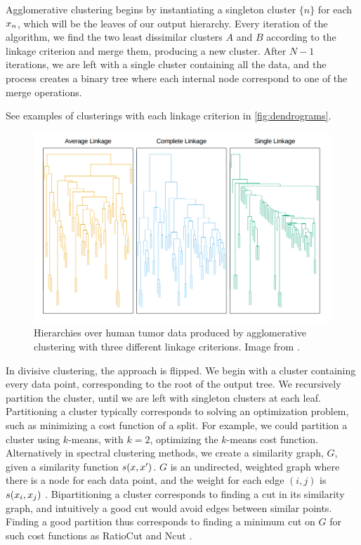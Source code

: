 Agglomerative clustering begins by instantiating
a singleton cluster $\{n\}$ for each $x_n$, which
will be the leaves of our output hierarchy.
Every iteration of the algorithm, 
we find
the two least dissimilar clusters $A$ and $B$
according to the linkage criterion
and merge them, producing a new cluster.
After $N - 1$ iterations, we are left
with a single cluster containing
all the data, and the process
creates a binary tree where each internal node
correspond to one of the merge operations.

See examples of clusterings with each
linkage criterion
in \autoref{fig:dendrograms}.


\begin{figure}[t]
  \includegraphics[width=\textwidth]{img/trees/dendrograms}
  \caption{Hierarchies over human tumor data produced by agglomerative clustering
    with three different linkage criterions. 
  Image from \citet{Hastie2009}.}
\label{fig:dendrograms}
\end{figure}

In divisive clustering, the approach is flipped.
We begin with a cluster containing
every data point, corresponding
to the root of the output tree.
We recursively
partition the cluster, until 
we are left with singleton clusters
at each leaf.
Partitioning a cluster
typically corresponds to solving
an optimization problem, such as minimizing
a cost function of a split.
For example, we could partition
a cluster using $k$-means, with $k = 2$,
optimizing the $k$-means cost function.
Alternatively in spectral clustering methods,
we create a similarity graph, $G$,
given a similarity function $s(x, x^\prime)$.
$G$ is an undirected, weighted graph
where there is a node for each data point,
and the weight for each edge $(i, j)$ is
$s(x_i, x_j)$ \citep{VonLuxburg2007}.
Bipartitioning a cluster
corresponds to finding a cut in its similarity graph,
and intuitively a good cut would avoid
edges between similar points.
Finding a good partition thus corresponds
to finding a minimum cut on $G$
for such cost functions as
RatioCut \citep{Hagen1992} and Ncut \citep{Shi2000}.

